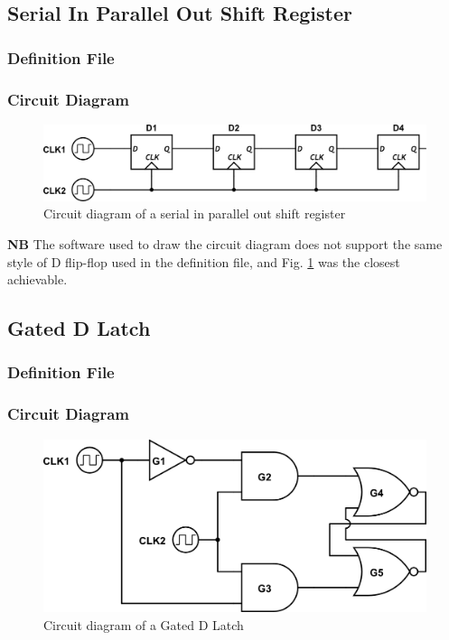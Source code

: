 \documentclass[a4paper,10pt]{article}
\begin{document}
\subsection{Serial In Parallel Out Shift Register}
\subsubsection{Definition File}

\subsubsection{Circuit Diagram}

\begin{figure}[h]
 \centering
 \includegraphics[width=12cm]{../../examples/sipo.png}
 \caption{Circuit diagram of a serial in parallel out shift register}
 \label{fig:example-sipo}
\end{figure}

\textbf{NB} The software used to draw the circuit diagram does not support the same style of D flip-flop used in the definition file, and Fig. \ref{fig:example-sipo} was the closest achievable.

\subsection{Gated D Latch}
\subsubsection{Definition File}

\subsubsection{Circuit Diagram}
\begin{figure}[h]
 \centering
 \includegraphics[width=12cm]{../../examples/gated-d-latch.png}
 \caption{Circuit diagram of a Gated D Latch}
 \label{fig:example-dlatch}
\end{figure}
\end{document}

